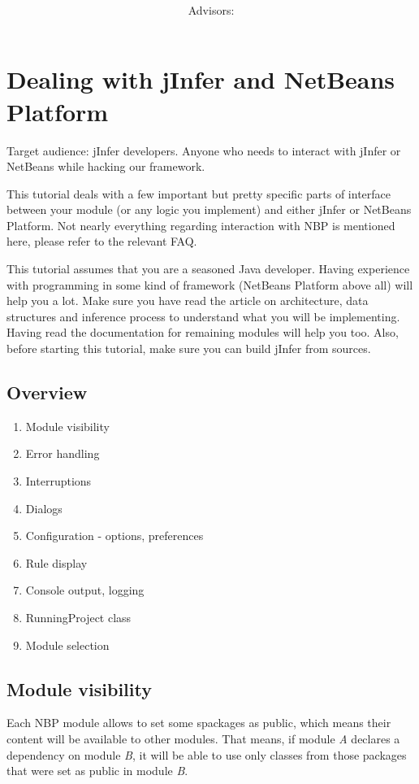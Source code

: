 \documentclass[a4paper,10pt,oneside]{article}
\title{\bf\mftitle}
\author{\mfauthor \\ Advisors: \mfadvisor}
\date{\mfplacedate}
\begin{document}
\maketitle
 


\section*{Dealing with jInfer and NetBeans Platform}
\par 
  Target audience: jInfer developers. Anyone who needs to interact with jInfer
  or NetBeans while hacking our framework.

\par 
  This tutorial deals with a few important but pretty specific parts of interface
  between your module (or any logic you implement) and either jInfer or NetBeans
  Platform. Not nearly everything regarding interaction with NBP is mentioned here,
  please refer to the relevant FAQ.

\par 
  
    This tutorial assumes that you are a seasoned Java developer. Having
    experience with programming in some kind of framework (NetBeans Platform
    above all) will help you a lot.
    Make sure you have read the article on
    architecture, data structures and inference process to understand what you
    will be implementing. Having read the documentation for
    remaining modules will help you too.
    Also, before starting this tutorial, make sure you can
    build jInfer from sources.
  

\subsection*{Overview}
\begin{enumerate}
  \item Module visibility
  \item Error handling
  \item Interruptions
  \item Dialogs
  \item Configuration - options, preferences
  \item Rule display
  \item Console output, logging
  \item RunningProject class
  \item Module selection
\end{enumerate}
\subsection*{Module visibility}
\par 
  Each NBP module allows to set some spackages as public, which means their content
  will be available to other modules. That means, if module \textit{A} declares a
  dependency on module \textit{B}, it will be able to use only classes from
  those packages that were set as public in module \textit{B}.
\end{document}
